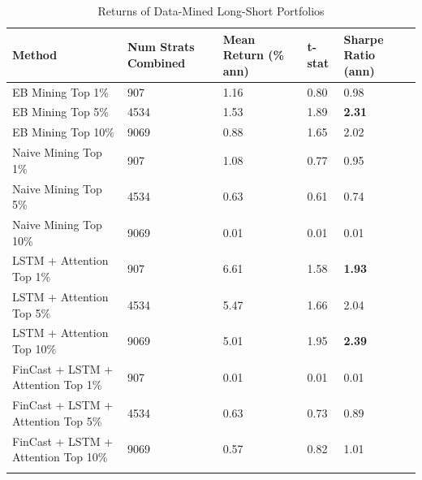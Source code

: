 \documentclass[pdflatex,sn-mathphys-num]{sn-jnl}%
\theoremstyle{thmstyleone}%
\theoremstyle{thmstyletwo}%
\theoremstyle{thmstylethree}%
\begin{document}
\begin{table}[h]
\caption{Returns of Data-Mined Long-Short Portfolios}\label{tab1}%
\begin{tabular}{@{}lllll@{}}
\toprule
Method & Num Strats Combined & Mean Return (\% ann)  & t-stat & Sharpe Ratio (ann) \\
\midrule
EB Mining Top 1\%    & 907 & 1.16  & 0.80 & 0.98 \\
EB Mining Top 5\%    & 4534   & 1.53  & 1.89   & \textbf{2.31}  \\
EB Mining Top 10\%    & 9069   & 0.88  & 1.65 & 2.02  \\
Naive Mining Top 1\%    & 907   & 1.08  & 0.77 & 0.95     \\
Naive Mining Top 5\%    & 4534   & 0.63  & 0.61  &  0.74   \\
Naive Mining Top 10\%    & 9069   & 0.01  &  0.01 &  0.01    \\
LSTM + Attention  Top 1\%    & 907   & 6.61  & 1.58  &   \textbf{1.93}  \\
LSTM + Attention  Top 5\%    & 4534   & 5.47    &  1.66 & 2.04  \\
LSTM + Attention  Top 10\%    & 9069   & 5.01  &  1.95  &  \textbf{2.39}   \\
FinCast + LSTM + Attention Top 1\%    & 907   & 0.01  & 0.01  &   0.01  \\
FinCast + LSTM + Attention Top 5\%    & 4534   & 0.63    &  0.73 & 0.89  \\
FinCast + LSTM + Attention Top 10\%    & 9069   & 0.57  &  0.82  &  1.01   \\

\botrule
\end{tabular}


\end{table}
\end{document}
